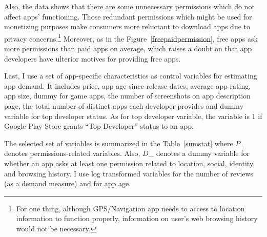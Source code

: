 \documentclass[12pt]{article}
\begin{document}
Also, the data shows that there are some unnecessary permissions which do not affect apps' functioning. Those redundant permissions which might be used for monetizing purposes make consumers more reluctant to download apps due to privacy concerns.\footnote{For one thing, although GPS/Navigation app needs to access to location information to function properly, information on user's web browsing history would not be necessary.} Moreover, as in the Figure~\ref{freepaidpermission}, free apps ask more permissions than paid apps on average, which raises a doubt on that app developers have ulterior motives for providing free apps.


Last, I use a set of app-specific characteristics as control variables for estimating app demand. It includes price, app age since release dates, average app rating, app size, dummy for game apps, the number of screenshots on app description page, the total number of distinct apps each developer provides and dummy variable for top developer status. As for top developer variable, the variable is 1 if Google Play Store grants ``Top Developer'' status to an app.

The selected set of variables is summarized in the Table~\ref{sumstat} where $P\_$ denotes permissions-related variables. Also, $D$\_ denotes a dummy variable for whether an app asks at least one permission related to location, social, identity, and browsing history. I use log transformed variables for the number of reviews (as a demand measure) and for app age. 
\end{document}
